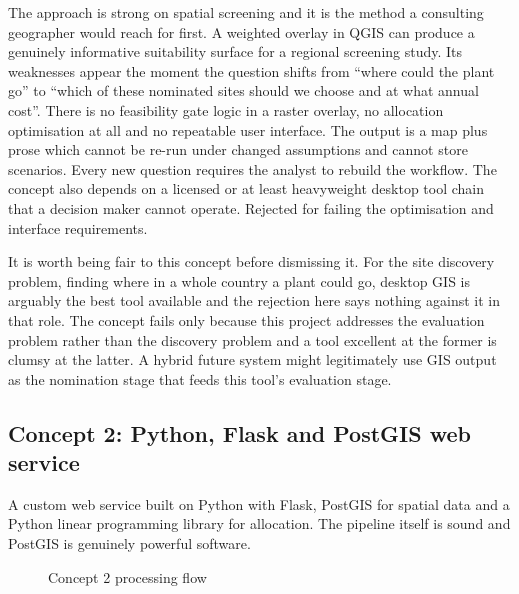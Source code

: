 \documentclass[12pt,a4paper]{report}
\begin{document}
The approach is strong on spatial screening and it is the method a
consulting geographer would reach for first. A weighted overlay in
QGIS can produce a genuinely informative suitability surface for a
regional screening study. Its weaknesses appear the moment the
question shifts from ``where could the plant go'' to ``which of these
nominated sites should we choose and at what annual cost''. There is
no feasibility gate logic in a raster overlay, no allocation
optimisation at all and no repeatable user interface. The output is a
map plus prose which cannot be re-run under changed assumptions and
cannot store scenarios. Every new question requires the analyst to
rebuild the workflow. The concept also depends on a licensed or at
least heavyweight desktop tool chain that a decision maker cannot
operate. Rejected for failing the optimisation and interface
requirements.

It is worth being fair to this concept before dismissing it. For the
site discovery problem, finding where in a whole country a plant could
go, desktop GIS is arguably the best tool available and the rejection
here says nothing against it in that role. The concept fails only
because this project addresses the evaluation problem rather than the
discovery problem and a tool excellent at the former is clumsy at the
latter. A hybrid future system might legitimately use GIS output as
the nomination stage that feeds this tool's evaluation stage.

\subsection{Concept 2: Python, Flask and PostGIS web service}
A custom web service built on Python with Flask, PostGIS for spatial
data and a Python linear programming library for allocation. The
pipeline itself is sound and PostGIS is genuinely powerful software.

\begin{figure}[h]
\centering
{}
\caption{Concept 2 processing flow}
\end{figure}
\end{document}
